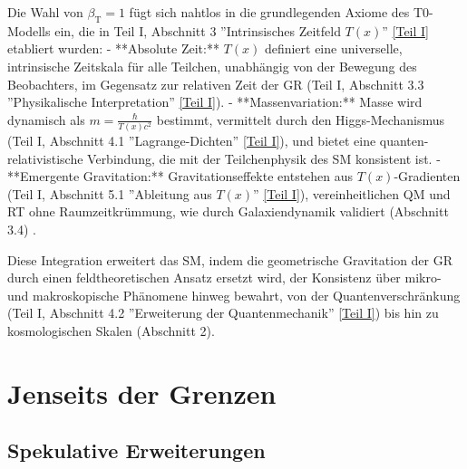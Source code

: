 \documentclass[12pt,a4paper]{article}
\newcommand{\Tfield}{T(x)}
\newcommand{\betaT}{\beta_{\text{T}}}
\begin{document}
	Die Wahl von \(\betaT = 1\) fügt sich nahtlos in die grundlegenden Axiome des T0-Modells ein, die in Teil I, Abschnitt 3 ''Intrinsisches Zeitfeld \(\Tfield\)'' \href{https://github.com/jpascher/T0-Time-Mass-Duality/tree/main/2/pdf/Deutsch/QMRelTimeMassPart1.pdf}{[Teil I]} etabliert wurden:
	- **Absolute Zeit:** \(\Tfield\) definiert eine universelle, intrinsische Zeitskala für alle Teilchen, unabhängig von der Bewegung des Beobachters, im Gegensatz zur relativen Zeit der GR (Teil I, Abschnitt 3.3 ''Physikalische Interpretation'' \href{https://github.com/jpascher/T0-Time-Mass-Duality/tree/main/2/pdf/Deutsch/QMRelTimeMassPart1.pdf}{[Teil I]}).
	- **Massenvariation:** Masse wird dynamisch als \(m = \frac{\hbar}{\Tfield c^2}\) bestimmt, vermittelt durch den Higgs-Mechanismus (Teil I, Abschnitt 4.1 ''Lagrange-Dichten'' \href{https://github.com/jpascher/T0-Time-Mass-Duality/tree/main/2/pdf/Deutsch/QMRelTimeMassPart1.pdf}{[Teil I]}), und bietet eine quanten-relativistische Verbindung, die mit der Teilchenphysik des SM konsistent ist.
	- **Emergente Gravitation:** Gravitationseffekte entstehen aus \(\Tfield\)-Gradienten (Teil I, Abschnitt 5.1 ''Ableitung aus \(\Tfield\)'' \href{https://github.com/jpascher/T0-Time-Mass-Duality/tree/main/2/pdf/Deutsch/QMRelTimeMassPart1.pdf}{[Teil I]}), vereinheitlichen QM und RT ohne Raumzeitkrümmung, wie durch Galaxiendynamik validiert (Abschnitt 3.4) \cite{pascher_lagrange_2025}.
	
	Diese Integration erweitert das SM, indem die geometrische Gravitation der GR durch einen feldtheoretischen Ansatz ersetzt wird, der Konsistenz über mikro- und makroskopische Phänomene hinweg bewahrt, von der Quantenverschränkung (Teil I, Abschnitt 4.2 ''Erweiterung der Quantenmechanik'' \href{https://github.com/jpascher/T0-Time-Mass-Duality/tree/main/2/pdf/Deutsch/QMRelTimeMassPart1.pdf}{[Teil I]}) bis hin zu kosmologischen Skalen (Abschnitt 2).
	
	\section{Jenseits der Grenzen}
	\label{sec:beyond_limits}
	
	\subsection{Spekulative Erweiterungen}
	\label{subsec:speculative_extensions}
	
\end{document}

